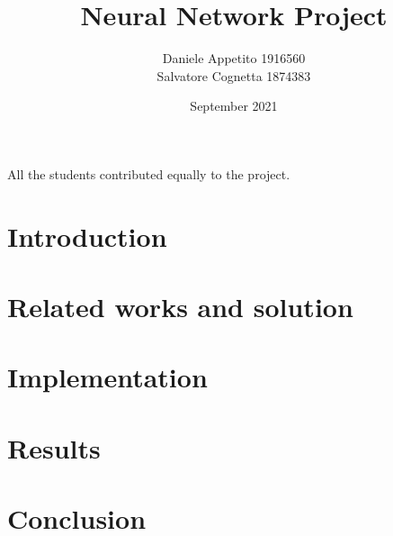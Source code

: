 \documentclass[12pt, letterpaper, twoside]{article}
\title{Neural Network Project}
\author{Daniele Appetito 1916560\\
 Salvatore Cognetta 1874383}
\date{September 2021}
\begin{document}
\begin{titlepage}
\maketitle
\end{titlepage}

\clearpage
\thispagestyle{empty}
\vspace*{\fill}
All the students contributed equally to the project.
\vspace*{\fill}
\clearpage


\tableofcontents

\newpage
    
\newpage
\section{Introduction}

\section{Related works and solution}

\newpage
\section{Implementation}

\newpage
\section{Results}
\newpage


\newpage
\section{Conclusion}


\newpage

\nocite{*}
\printbibliography[heading=bibintoc,title={References}]
\end{document}
